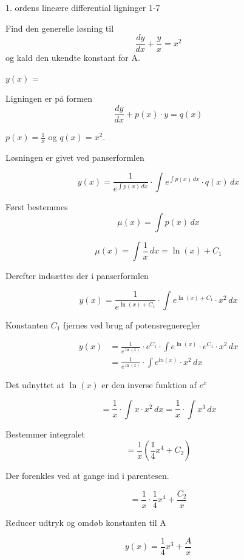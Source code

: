 \documentclass{article}
\begin{document}
\begin{exercise}{1. ordens lineære differential ligninger 1-7}
	
	
	Find den generelle løsning til
	\[
	\frac{dy}{dx} +  \frac{y}{x} = x^2
	\]
	og kald den ukendte konstant for A.
	
	$y(x)$ =   
	
	
	
	\hint
	
	Ligningen er på formen
	\[
	\frac{dy}{dx} + p(x) \cdot y = q(x)
	\]
	
	\hint
	
	$p(x)=\frac{1}{x}$ og $q(x)=x^2$.
	
	\hint
	
	Løsningen er givet ved panserformlen
	
	
	\hint
	
	\[
	y(x) = \frac{1}{e^{\int p(x) \, dx}} \cdot \int e^{\int p(x) \, dx}  \cdot q(x) \, dx
	\]
	
	\hint
	
	Først bestemmes 
	\[
	\mu(x) = \int p(x) \, dx
	\]
	
	\hint
	\[
	\mu(x) = \int \frac{1}{x} \, dx = \ln(x)+ C_1
	\]
	
	\hint
	Derefter indsættes der i  panserformlen
	
	\hint
	
	\[
	y(x) = \frac{1}{e^{\ln(x) + C_1}} \cdot \int e^{\ln(x) + C_1}  \cdot x^2 \, dx
	\]
	
	
	\hint
	
	Konstanten $C_1$ fjernes ved brug af potensregneregler
	
	\hint
	\begin{align*}
	y(x) &= \frac{1}{e^{\ln(x)}} \cdot e^{C_1} \cdot \int e^{\ln(x)} \cdot e^{C_1}  \cdot x^2 \, dx  \\
	&= \frac{1}{e^{\ln(x)}} \cdot \int e^{ln(x)}  \cdot x^2 \, dx
	\end{align*}
	
	\hint
	
	Det udnyttet at $\ln(x)$ er den inverse funktion af $e^x$
	
	
	\hint
	\[
	= \frac{1}{x} \cdot \int x  \cdot x^2 \, dx =  \frac{1}{x} \cdot \int  x^3 \, dx
	\]
	
	\hint
	
	Bestemmer integralet
	\[
	= \frac{1}{x} \left( \frac{1}{4}x^4 + C_2    \right)
	\]
	
	\hint
	
	Der forenkles ved at gange ind i parentesen.
	
	\hint
	\[
	= \frac{1}{x} \cdot \frac{1}{4}x^4 + \frac{C_2}{x} 
	\]
	
	\hint
	
	Reducer udtryk og omdøb konstanten til A
	
	\hint
	\[
	y(x) =  \frac{1}{4}x^3 + \frac{A}{x}
	\]
	
	
\end{exercise}
\end{document}
